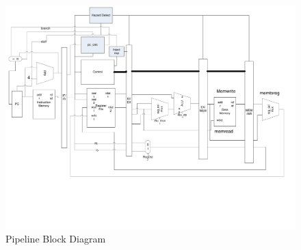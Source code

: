 \documentclass[12pt]{article}
\begin{document}
\newpage

\begin{landscape}

\begin{figure}
	\begin{center}
		\includegraphics[width=7in]{bld_pipeline_branch}
	\end{center}
	\caption{Pipeline Block Diagram}
	\label{fig:pipeline}
\end{figure}

\end{landscape}

\newpage
\end{document}
